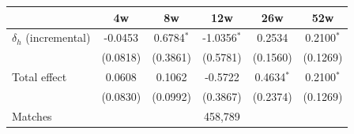 \begin{tabular}{l*{5}{c}}
\toprule
 & 4w & 8w & 12w & 26w & 52w \\
\midrule
$\delta_h$ (incremental) & -0.0453 & 0.6784$^{*}$ & -1.0356$^{*}$ & 0.2534 & 0.2100$^{*}$ \\
 & (0.0818) & (0.3861) & (0.5781) & (0.1560) & (0.1269) \\[0.3em]
Total effect & 0.0608 & 0.1062 & -0.5722 & 0.4634$^{*}$ & 0.2100$^{*}$ \\
 & (0.0830) & (0.0992) & (0.3867) & (0.2374) & (0.1269) \\
\midrule
Matches & \multicolumn{5}{c}{458,789} \\
\bottomrule
\end{tabular}
